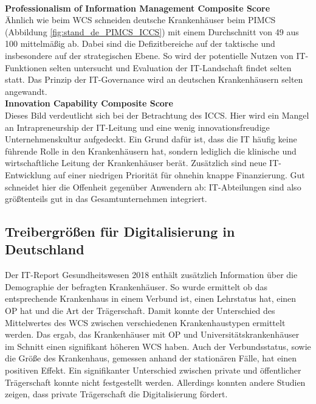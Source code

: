 \vspace{\parheadvspace}\\
\textbf{Professionalism of Information Management Composite Score}\\
Ähnlich wie beim WCS schneiden deutsche Krankenhäuser beim PIMCS (Abbildung \ref{fig:stand_de_PIMCS_ICCS}) mit einem Durchschnitt von 49 aus 100 mittelmäßig ab. Dabei sind die Defizitbereiche auf der taktische und insbesondere auf der strategischen Ebene. So wird der potentielle Nutzen von IT-Funktionen selten untersucht und Evaluation der IT-Landschaft findet selten statt. Das Prinzip der IT-Governance wird an deutschen Krankenhäusern selten angewandt.
\vspace{\parheadvspace}\\
\textbf{Innovation Capability Composite Score}\\
Dieses Bild verdeutlicht sich bei der Betrachtung des ICCS. Hier wird ein Mangel an Intrapreneurship der IT-Leitung und eine wenig innovationsfreudige Unternehmenskultur aufgedeckt. Ein Grund dafür ist, dass die IT häufig keine führende Rolle in den Krankenhäusern hat, sondern lediglich die klinische und wirtschaftliche Leitung der Krankenhäuser berät. Zusätzlich sind neue IT-Entwicklung auf einer niedrigen Priorität für ohnehin knappe Finanzierung. Gut schneidet hier die Offenheit gegenüber Anwendern ab: IT-Abteilungen sind also größtenteils gut in das Gesamtunternehmen integriert.
\subsection{Treibergrößen für Digitalisierung in Deutschland}
Der IT-Report Gesundheitswesen 2018 enthält zusätzlich Information über die Demographie der befragten Krankenhäuser. So wurde ermittelt ob das entsprechende Krankenhaus in einem Verbund ist, einen Lehrstatus hat, einen OP hat und die Art der Trägerschaft. Damit konnte der Unterschied des Mittelwertes des WCS zwischen verschiedenen Krankenhaustypen ermittelt werden. Das ergab, das Krankenhäuser mit OP und Universitätskrankenhäuser im Schnitt einen signifikant höheren WCS haben. Auch der Verbundsstatus, sowie die Größe des Krankenhaus, gemessen anhand der stationären Fälle, hat einen positiven Effekt. \parencite{huebner2019}
Ein signifikanter Unterschied zwischen private und öffentlicher Trägerschaft konnte nicht festgestellt werden. Allerdings konnten andere Studien zeigen, dass private Trägerschaft die Digitalisierung fördert. \cite{cresswell2013} 

